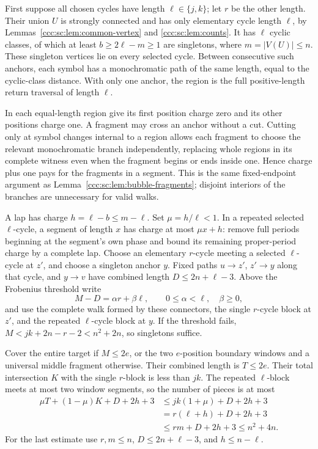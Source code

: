 \documentclass[11pt,letterpaper]{article}
\theoremstyle{definition}
\theoremstyle{remark}
\begin{document}
First suppose all chosen cycles have length $\ell\in\{j,k\}$; let $r$ be the other length. Their union $U$ is strongly connected and has only elementary cycle length $\ell$, by Lemmas~\ref{ccc:sc:lem:common-vertex} and \ref{ccc:sc:lem:counts}. It has $\ell$ cyclic classes, of which at least $b\ge2\ell-m\ge1$ are singletons, where $m=|V(U)|\le n$. These singleton vertices lie on every selected cycle. Between consecutive such anchors, each symbol has a monochromatic path of the same length, equal to the cyclic-class distance. With only one anchor, the region is the full positive-length return traversal of length $\ell$.

In each equal-length region give its first position charge zero and its other positions charge one. A fragment may cross an anchor without a cut. Cutting only at symbol changes internal to a region allows each fragment to choose the relevant monochromatic branch independently, replacing whole regions in its complete witness even when the fragment begins or ends inside one. Hence charge plus one pays for the fragments in a segment. This is the same fixed-endpoint argument as Lemma~\ref{ccc:sc:lem:bubble-fragments}; disjoint interiors of the branches are unnecessary for valid walks.

A lap has charge $h=\ell-b\le m-\ell$. Set $\mu=h/\ell<1$. In a repeated selected $\ell$-cycle, a segment of length $x$ has charge at most $\mu x+h$: remove full periods beginning at the segment's own phase and bound its remaining proper-period charge by a complete lap. Choose an elementary $r$-cycle meeting a selected $\ell$-cycle at $z'$, and choose a singleton anchor $y$. Fixed paths $u\to z'$, $z'\to y$ along that cycle, and $y\to v$ have combined length $D\le2n+\ell-3$. Above the Frobenius threshold write
\[
 M-D=\alpha r+\beta\ell,\qquad0\le\alpha<\ell,\quad\beta\ge0,
\]
and use the complete walk formed by these connectors, the single $r$-cycle block at $z'$, and the repeated $\ell$-cycle block at $y$. If the threshold fails, $M<jk+2n-r-2<n^2+2n$, so singletons suffice.

Cover the entire target if $M\le2e$, or the two $e$-position boundary windows and a universal middle fragment otherwise. Their combined length is $T\le2e$. Their total intersection $K$ with the single $r$-block is less than $jk$. The repeated $\ell$-block meets at most two window segments, so the number of pieces is at most
\begin{align*}
 \mu T+(1-\mu)K+D+2h+3
 &\le jk(1+\mu)+D+2h+3\\
 &=r(\ell+h)+D+2h+3\\
 &\le rm+D+2h+3\le n^2+4n.
\end{align*}
For the last estimate use $r,m\le n$, $D\le2n+\ell-3$, and $h\le n-\ell$.
\end{document}
